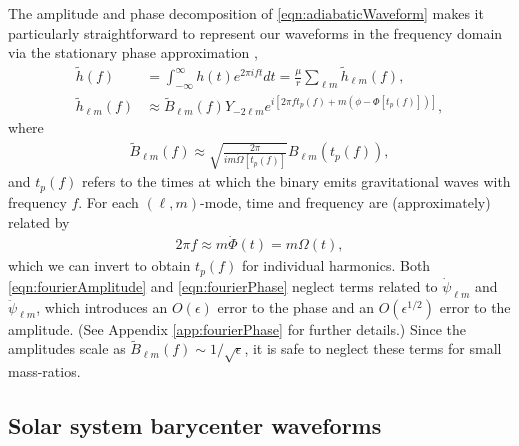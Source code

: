 \documentclass[%
 reprint,
 nofootinbib,
 amsmath,amssymb,
 aps,
 prd,
]{revtex4-2}
\begin{document}
The amplitude and phase decomposition of \eqref{eqn:adiabaticWaveform} makes it particularly straightforward to represent our waveforms in the frequency domain via the stationary phase approximation \cite{HughETC21},
\begin{subequations} \label{eqn:fourierH}
\begin{align}
    \tilde{h}(f) &= \int_{-\infty}^\infty h(t) e^{2\pi i f t} dt =  \frac{\mu}{r}\sum_{\ell m}\tilde{h}_{\ell m}(f),
    \\ 
    \tilde{h}_{\ell m}(f) & \approx \tilde{B}_{\ell m}(f) Y_{-2\ell m} e^{i[2\pi f t_p(f)+ m(\phi-\Phi[t_p(f)])]},
\end{align}
\end{subequations}
where
\begin{align} \label{eqn:fourierAmplitude}
    \tilde{B}_{\ell m}(f) \approx \sqrt{\frac{2\pi}{i m \dot{\Omega}[t_p(f)]}} {B}_{\ell m}(t_p(f)),
\end{align}
and $t_p(f)$ refers to the times at which the binary emits gravitational waves with frequency $f$. For each $(\ell, m)$-mode, time and frequency are (approximately) related by
\begin{align} \label{eqn:fourierPhase}
    2\pi f \approx m \dot{\Phi}(t) = m \Omega(t),
\end{align}
which we can invert to obtain $t_p(f)$ for individual harmonics. Both \eqref{eqn:fourierAmplitude} and \eqref{eqn:fourierPhase} neglect terms related to $\dot{\psi}_{\ell m}$ and $\ddot{\psi}_{\ell m}$, which introduces an $O(\epsilon)$ error to the phase and an $O(\epsilon^{1/2})$ error to the amplitude. (See Appendix \ref{app:fourierPhase} for further details.) Since the amplitudes scale as $\tilde{B}_{\ell m}(f) \sim 1/\sqrt{\epsilon}$, it is safe to neglect these terms for small mass-ratios.

\subsection{Solar system barycenter waveforms}
\end{document}
